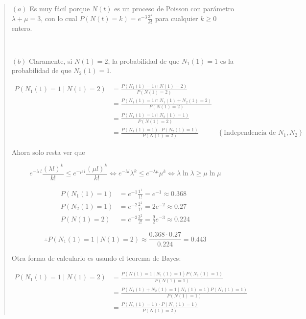 \documentclass[a4paper, 12pt]{article}
\begin{document}
\small
\begin{quote}

$(a)$ Es muy fácil porque $N(t)$ es un proceso de Poisson con parámetro $\lambda
+ \mu = 3$, con lo cual $P(N(t) = k) = e^{-3} \frac{3^k}{k!}$ para cualquier $k
\geq 0$ entero.

~ 

$(b)$ Claramente, si $N(1) = 2$, la probabilidad de que $N_1(1) = 1$ es la
probabilidad de que $N_2(1) = 1$.

\begin{align*}
  P(N_1(1) = 1 \mid N(1) = 2) 
  &= \frac{P(N_1(1) = 1 \cap N(1) = 2)}{P( N(1) = 2 )} \\ 
  &= \frac{ P(N_1(1) = 1 \cap  N_1(1) + N_2(1) = 2) }{P(N(1) = 2)} \\ 
  &= \frac{ P(N_1(1) = 1 \cap N_2(1) = 1) }{P(N(1) = 2)} \\ 
  &=\frac{ P(N_1(1) = 1) \cdot P(N_2(1) = 1) }{P(N(1) = 2)} &\left\{
  \text{Independencia de } N_1, N_2 \right\} 
\end{align*}

Ahora solo resta ver que 

\begin{equation*}
  e^{-\lambda ~ l} \frac{( \lambda l)^k}{k!} \leq e^{- \mu ~ l} \frac{( \mu l )^k}{k!} \iff
  e^{-\lambda l} \lambda^k \leq e^{-\lambda \mu} \mu^k \iff \lambda  \ln
  \lambda \geq \mu  \ln \mu
\end{equation*}

\begin{align*}
  P(N_1(1) = 1) &= e^{-1} \frac{1^1}{1!} = e^{-1} \approx 0.368 \\ 
  P(N_2(1) = 1)&= e^{-2} \frac{2^1}{1!} = 2e^{-2} \approx 0.27\\ 
  P(N(1) = 2) &= e^{-3} \frac{3^2}{2!} = \frac{9}{2}e^{-3} \approx 0.224
\end{align*}

\begin{equation*}
  \therefore P(N_1(1) = 1 \mid N(1) = 2) \approx \frac{0.368 \cdot 0.27}{0.224}
  = 0.443
\end{equation*}

Otra forma de calcularlo es usando el teorema de Bayes:

\begin{align*}
  P(N_1(1) = 1 \mid N(1) = 2) 
  &= \frac{P(N(1) = 1 \mid N_1(1) = 1) P(N_1(1) =
  1)}{P(N(1) = 1)} \\ 
  &= \frac{P(N_1(1) + N_2(1) = 1 \mid N_1(1) = 1) P(N_1(1) = 1)}{P(N(1) = 1)} \\ 
  &=\frac{ P(N_2(1) = 1) \cdot P(N_1(1) = 1) }{P(N(1) = 2)}
\end{align*}


\end{quote}
\end{document}
